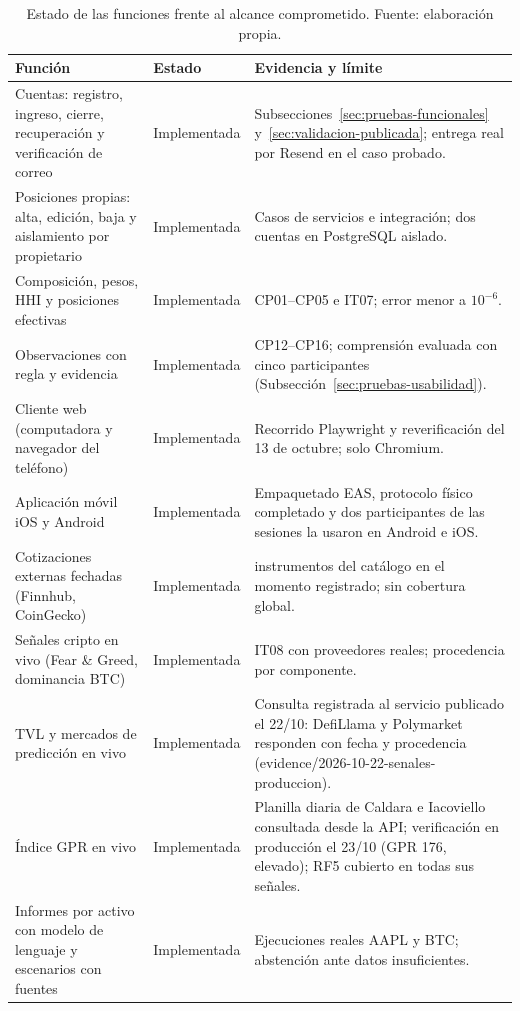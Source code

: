 \begin{table}[ht]
\centering\small\renewcommand{\arraystretch}{1.15}
\caption{Estado de las funciones frente al alcance comprometido. Fuente: elaboración propia.}\label{tab:estado-funcional}
\begin{tabular}{>{\raggedright\arraybackslash}p{5.2cm}>{\raggedright\arraybackslash}p{2.1cm}>{\raggedright\arraybackslash}p{6.3cm}}\hline
\textbf{Función} & \textbf{Estado} & \textbf{Evidencia y límite}\\\hline
Cuentas: registro, ingreso, cierre, recuperación y verificación de correo & Implementada & Subsecciones~\ref{sec:pruebas-funcionales} y~\ref{sec:validacion-publicada}; entrega real por Resend en el caso probado.\\
Posiciones propias: alta, edición, baja y aislamiento por propietario & Implementada & Casos de servicios e integración; dos cuentas en PostgreSQL aislado.\\
Composición, pesos, HHI y posiciones efectivas & Implementada & CP01--CP05 e IT07; error menor a $10^{-6}$.\\
Observaciones con regla y evidencia & Implementada & CP12--CP16; comprensión evaluada con cinco participantes (Subsección~\ref{sec:pruebas-usabilidad}).\\
Cliente web (computadora y navegador del teléfono) & Implementada & Recorrido Playwright y reverificación del 13 de octubre; solo Chromium.\\
Aplicación móvil iOS y Android & Implementada & Empaquetado EAS, protocolo físico completado y dos participantes de las sesiones la usaron en Android e iOS.\\
Cotizaciones externas fechadas (Finnhub, CoinGecko) & Implementada & 34 instrumentos del catálogo en el momento registrado; sin cobertura global.\\
Señales cripto en vivo (Fear \& Greed, dominancia BTC) & Implementada & IT08 con proveedores reales; procedencia por componente.\\
TVL y mercados de predicción en vivo & Implementada & Consulta registrada al servicio publicado el 22/10: DefiLlama y Polymarket responden con fecha y procedencia (evidence/2026-10-22-senales-produccion).\\
Índice GPR en vivo & Implementada & Planilla diaria de Caldara e Iacoviello consultada desde la API; verificación en producción el 23/10 (GPR 176, elevado); RF5 cubierto en todas sus señales.\\
Informes por activo con modelo de lenguaje y escenarios con fuentes & Implementada & Ejecuciones reales AAPL y BTC; abstención ante datos insuficientes.\\

\end{tabular}
\end{table}
